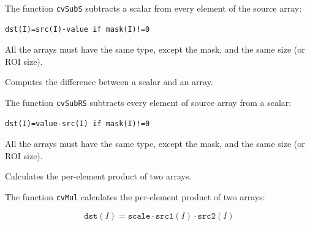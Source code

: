 The function \texttt{cvSubS} subtracts a scalar from every element of the source array:

\begin{lstlisting}
dst(I)=src(I)-value if mask(I)!=0
\end{lstlisting}

All the arrays must have the same type, except the mask, and the same size (or ROI size).


\label{SubRS}

Computes the difference between a scalar and an array.


\begin{description}
\end{description}


The function \texttt{cvSubRS} subtracts every element of source array from a scalar:

\begin{lstlisting}
dst(I)=value-src(I) if mask(I)!=0
\end{lstlisting}

All the arrays must have the same type, except the mask, and the same size (or ROI size).

\label{Mul}

Calculates the per-element product of two arrays.


\begin{description}
\end{description}


The function \texttt{cvMul} calculates the per-element product of two arrays:

\[
\texttt{dst}(I)=\texttt{scale} \cdot \texttt{src1}(I) \cdot \texttt{src2}(I)
\]


